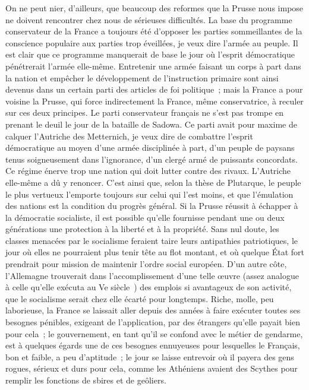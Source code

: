 \documentclass[french,twoside]{book} %
\begin{document}
On ne peut nier, d’ailleurs, que beaucoup des reformes que la Prusse nous impose ne doivent rencontrer chez nous de sérieuses difficultés. La base du programme conservateur de la France a toujours été d’opposer les parties sommeillantes de la conscience populaire aux parties trop éveillées, je veux dire l’armée au peuple. Il est clair que ce programme manquerait de base le jour où l’esprit démocratique pénétrerait l’armée elle-même. Entretenir une armée faisant un corps à part dans la nation et empêcher le développement de l’instruction primaire sont ainsi devenus dans un certain parti des articles de foi politique ; mais la France a pour voisine la Prusse, qui force indirectement la France, même conservatrice, à reculer sur ces deux principes. Le parti conservateur français ne s’est pas trompe en prenant le deuil le jour de la bataille de Sadowa. Ce parti avait pour maxime de calquer l’Autriche des Metternich, je veux dire de combattre l’esprit démocratique au moyen d’une armée disciplinée à part, d’un peuple de paysans tenus soigneusement dans l’ignorance, d’un clergé armé de puissants concordats. Ce régime énerve trop une nation qui doit lutter contre des rivaux. L’Autriche elle-même a dû y renoncer. C’est ainsi que, selon la thèse de Plutarque, le peuple le plus vertueux l’emporte toujours sur celui qui l’est moins, et que l’émulation des nations est la condition du progrès général. Si la Prusse réussit à échapper à la démocratie socialiste, il est possible qu’elle fournisse pendant une ou deux générations une protection à la liberté et à la propriété. Sans nul doute, les classes menacées par le socialisme feraient taire leurs antipathies patriotiques, le jour où elles ne pourraient plus tenir tête au flot montant, et où quelque État fort prendrait pour mission de maintenir l’ordre social européen. D’un autre côte, l’Allemagne trouverait dans l’accomplissement d’une telle œuvre (assez analogue à celle qu’elle exécuta au Ve siècle ) des emplois si avantageux de son activité, que le socialisme serait chez elle écarté pour longtemps. Riche, molle, peu laborieuse, la France se laissait aller depuis des années à faire exécuter toutes ses besognes pénibles, exigeant de l’application, par des étrangers qu’elle payait bien pour cela ; le gouvernement, en tant qu’il se confond avec le métier de gendarme, est à quelques égards une de ces besognes ennuyeuses pour lesquelles le Français, bon et faible, a peu d’aptitude ; le jour se laisse entrevoir où il payera des gens rogues, sérieux et durs pour cela, comme les Athéniens avaient des Scythes pour remplir les fonctions de sbires et de geôliers.\par
\end{document}
